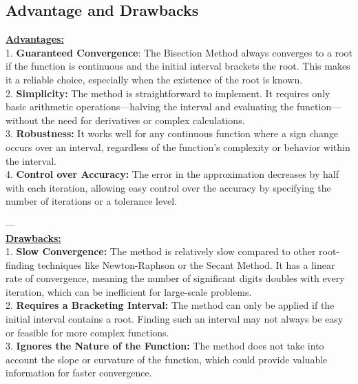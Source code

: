 \documentclass[12pt,a4paper]{article}
\begin{document}
	\subsection{Advantage and Drawbacks} 
	\textbf{ \underline{Advantages:} }\\
	
	1. \textbf{Guaranteed Convergence}: The Bisection Method always converges to a root if the function is continuous and the initial interval brackets the root. This makes it a reliable choice, especially when the existence of the root is known.\\
	
	2. \textbf{Simplicity:} The method is straightforward to implement. It requires only basic arithmetic operations—halving the interval and evaluating the function—without the need for derivatives or complex calculations.\\
	
	3. \textbf{Robustness:} It works well for any continuous function where a sign change occurs over an interval, regardless of the function's complexity or behavior within the interval.\\
	
	4. \textbf{Control over Accuracy:} The error in the approximation decreases by half with each iteration, allowing easy control over the accuracy by specifying the number of iterations or a tolerance level.
	
	---\\
	
	\textbf{ \underline{Drawbacks:} }\\
	
	1. \textbf{Slow Convergence:} The method is relatively slow compared to other root-finding techniques like Newton-Raphson or the Secant Method. It has a linear rate of convergence, meaning the number of significant digits doubles with every iteration, which can be inefficient for large-scale problems.\\
	
	2. \textbf{Requires a Bracketing Interval:} The method can only be applied if the initial interval contains a root. Finding such an interval may not always be easy or feasible for more complex functions.\\
	
	3. \textbf{Ignores the Nature of the Function:} The method does not take into account the slope or curvature of the function, which could provide valuable information for faster convergence.\\
	
\end{document}
